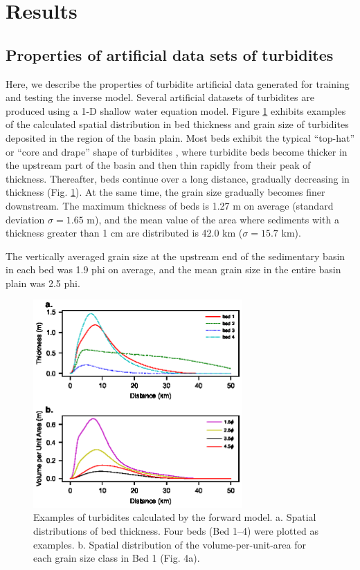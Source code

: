 
\section{Results}

\subsection{Properties of artificial data sets of turbidites}
Here, we describe the properties of turbidite artificial data generated for training and testing the inverse model. Several artificial datasets of turbidites are produced using a 1-D shallow water equation model. Figure \ref{fig:training_examples_artificial_turbidites} exhibits examples of the calculated spatial distribution in bed thickness and grain size of turbidites deposited in the region of the basin plain. Most beds exhibit the typical ``top-hat'' or ``core and drape'' shape of turbidites \cite{Hirayama1977,Talling2012,Pantopoulos2013}, where turbidite beds become thicker in the upstream part of the basin and then thin rapidly from their peak of thickness. Thereafter, beds continue over a long distance, gradually decreasing in thickness (Fig. \ref{fig:training_examples_artificial_turbidites}). At the same time, the grain size gradually becomes finer downstream. The maximum thickness of beds is 1.27 m on average (standard deviation $\sigma = 1.65$ m), and the mean value of the area where sediments with a thickness greater than 1 cm are distributed is 42.0 km ($\sigma=15.7$ km). 

The vertically averaged grain size at the upstream end of the sedimentary basin in each bed was 1.9 phi on average, and the mean grain size in the entire basin plain was 2.5 phi. 

\begin{figure}[t]
  \includegraphics[width=8cm]{fig04.eps}
  \caption{Examples of turbidites calculated by the forward model. \textsf{a}. Spatial distributions of bed thickness. Four beds (Bed 1--4) were plotted as examples. \textsf{b}. Spatial distribution of the volume-per-unit-area for each grain size class in Bed 1 (Fig. 4a).}
  \label{fig:training_examples_artificial_turbidites}
\end{figure}

